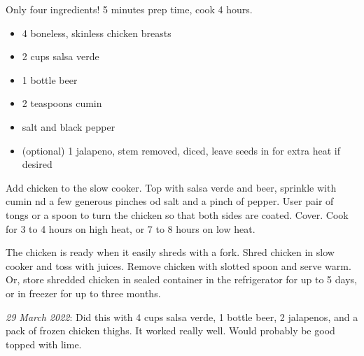 \fromMom

Only four ingredients!
5 minutes prep time, cook 4 hours.

\ingredients
\begin{itemize}
    \item 4 boneless, skinless chicken breasts
    \item 2 cups salsa verde
    \item 1 bottle beer
    \item 2 teaspoons cumin
    \item salt and black pepper
    \item (optional) 1 jalapeno, stem removed, diced, leave seeds in for extra heat if desired
\end{itemize}

\instructions

Add chicken to the slow cooker. Top with salsa verde and beer, sprinkle with
cumin nd a few generous pinches od salt and a pinch of pepper. User pair of
tongs or a spoon to turn the chicken so that both sides are coated. Cover. Cook
for 3 to 4 hours on high heat, or 7 to 8 hours on low heat.

The chicken is ready when it easily shreds with a fork. Shred chicken in slow
cooker and toss with juices. Remove chicken with slotted spoon and serve warm.
Or, store shredded chicken in sealed container in the refrigerator for up to 5
days, or in freezer for up to three months. 

\notes

\textit{29 March 2022}: Did this with 4 cups salsa verde, 1 bottle beer, 2
jalapenos, and a pack of frozen chicken thighs. It worked really well. Would
probably be good topped with lime.
